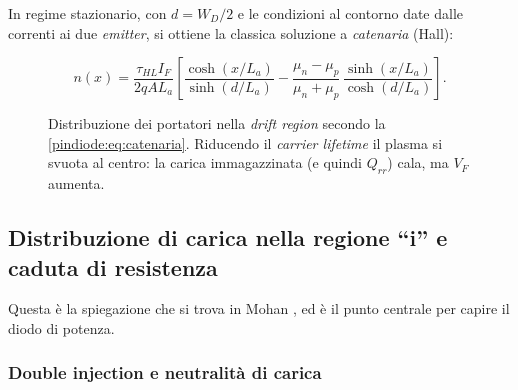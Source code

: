 In regime stazionario, con $d = W_D/2$ e le condizioni al contorno date dalle
correnti ai due \emph{emitter}, si ottiene la classica soluzione a \emph{catenaria}
(Hall):

\begin{equation}
n(x) = \frac{\tau_{HL} I_F}{2 q A L_a}
\left[
\frac{\cosh(x/L_a)}{\sinh(d/L_a)}
- \frac{\mu_n - \mu_p}{\mu_n + \mu_p}\,
\frac{\sinh(x/L_a)}{\cosh(d/L_a)}
\right] .
\label{pindiode:eq:catenaria}
\end{equation}

\begin{figure}[htbp]
\centering
{}
\caption{Distribuzione dei portatori nella \emph{drift region} secondo la
\eqref{pindiode:eq:catenaria}. Riducendo il \emph{carrier lifetime} il plasma si
svuota al centro: la carica immagazzinata (e quindi $Q_{rr}$) cala, ma
$V_F$ aumenta.}
\label{pindiode:fig:catenaria}
\end{figure}

\subsection{Distribuzione di carica nella regione ``i'' e caduta di resistenza}
\label{pindiode:sec:mohan}

Questa è la spiegazione che si trova in Mohan \cite{mohan}, ed è il punto
centrale per capire il diodo di potenza.

\subsubsection*{Double injection e neutralità di carica}

